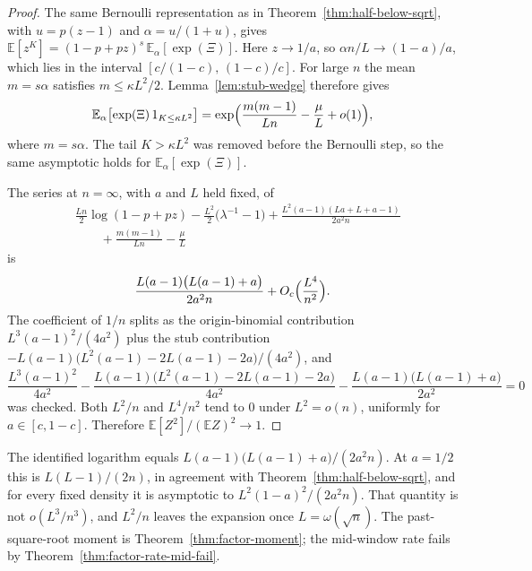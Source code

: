 \documentclass[11pt]{article}
\newcommand{\EE}{\mathbb{E}}
\begin{document}
\begin{proof}
The same Bernoulli representation as in Theorem~\ref{thm:half-below-sqrt},
with \(u=p(z-1)\) and \(\alpha=u/(1+u)\), gives
\(\EE[z^K]=(1-p+pz)^s\,\EE_\alpha[\exp(\Xi)]\).
Here \(z\to 1/a\), so \(\alpha n/L\to(1-a)/a\), which lies in the interval
\([c/(1-c),\,(1-c)/c]\). For large \(n\) the mean \(m=s\alpha\) satisfies
\(m\le\kappa L^2/2\).
Lemma~\ref{lem:stub-wedge} therefore gives
\[
\EE_\alpha\bigl[\exp(\Xi)\,1_{K\le\kappa L^2}\bigr]
=\exp\Bigl(\frac{m(m-1)}{Ln}-\frac{\mu}{L}+o(1)\Bigr),
\]
where \(m=s\alpha\). The tail \(K>\kappa L^2\) was removed before the Bernoulli
step, so the same asymptotic holds for \(\EE_\alpha[\exp(\Xi)]\).

The series at \(n=\infty\), with \(a\) and \(L\) held fixed, of
\[
\begin{aligned}
&\frac{Ln}{2}\log(1-p+pz)
-\frac{L^2}{2}\bigl(\lambda^{-1}-1\bigr)
+\frac{L^2(a-1)(La+L+a-1)}{2a^2 n}\\
&\qquad
+\frac{m(m-1)}{Ln}-\frac{\mu}{L}
\end{aligned}
\]
is
\[
\frac{L(a-1)\bigl(L(a-1)+a\bigr)}{2a^2 n}+O_c\Bigl(\frac{L^4}{n^2}\Bigr).
\]
The coefficient of \(1/n\) splits as the origin-binomial contribution
\(L^3(a-1)^2/(4a^2)\) plus the stub contribution
\(-L(a-1)\bigl(L^2(a-1)-2L(a-1)-2a\bigr)/(4a^2)\),
and
\[
\frac{L^3(a-1)^2}{4a^2}
-\frac{L(a-1)\bigl(L^2(a-1)-2L(a-1)-2a\bigr)}{4a^2}
-\frac{L(a-1)\bigl(L(a-1)+a\bigr)}{2a^2}
=0
\]
was checked. Both \(L^2/n\) and \(L^4/n^2\) tend to \(0\) under
\(L^2=o(n)\), uniformly for \(a\in[c,1-c]\).
Therefore \(\EE[Z^2]/(\EE Z)^2\to 1\).
\end{proof}

The identified logarithm equals
\(L(a-1)\bigl(L(a-1)+a\bigr)/(2a^2 n)\).
At \(a=1/2\) this is \(L(L-1)/(2n)\), in agreement with
Theorem~\ref{thm:half-below-sqrt}, and for every fixed density it is
asymptotic to \(L^2(1-a)^2/(2a^2 n)\).
That quantity is not \(o(L^3/n^3)\), and \(L^2/n\) leaves the expansion
once \(L=\omega(\sqrt{n})\). The past-square-root moment is
Theorem~\ref{thm:factor-moment}; the mid-window rate fails by
Theorem~\ref{thm:factor-rate-mid-fail}.
\end{document}
